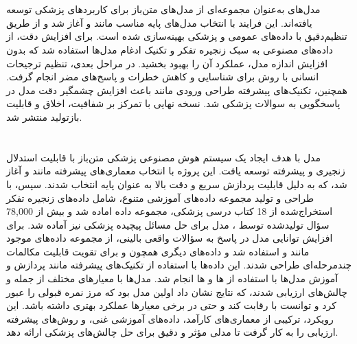 \documentclass[11pt, a4paper, oneside]{book}
\begin{document}
		\section{}
			مدل‌های  به‌عنوان مجموعه‌ای از مدل‌های متن‌باز برای کاربردهای پزشکی توسعه یافته‌اند. این فرایند با انتخاب مدل‌های پایه مناسب مانند  و  آغاز شد و از طریق تنظیم‌دقیق با داده‌های عمومی و پزشکی بهینه‌سازی شده است. برای افزایش دقت، از داده‌های مصنوعی به سبک زنجیره تفکر و تکنیک ادغام مدل‌ها استفاده شد که بدون افزایش اندازه مدل، عملکرد آن را بهبود بخشید. در مراحل بعدی، تنظیم ترجیحات انسانی با روش   برای شناسایی و کاهش خطرات و پاسخ‌های مضر انجام گرفت. همچنین، تکنیک‌های پیشرفته طراحی ورودی مانند  باعث افزایش چشمگیر دقت مدل در پاسخگویی به سوالات پزشکی شد. نسخه نهایی  با تمرکز بر شفافیت، اخلاق و قابلیت بازتولید منتشر شد. \cite{gururajan_aloe_2024}
			
		
		\section{}
			مدل  با هدف ایجاد یک سیستم هوش مصنوعی پزشکی متن‌باز با قابلیت استدلال زنجیری و پیشرفته توسعه یافت. این پروژه با انتخاب معماری‌های پیشرفته مانند  و  آغاز شد، که به دلیل قابلیت پردازش سریع و دقت بالا به عنوان پایه انتخاب شدند. سپس، با طراحی و تولید مجموعه داده‌های آموزشی متنوع، شامل داده‌های زنجیره‌ تفکر استخراج‌شده از 18 کتاب درسی پزشکی، مجموعه داده  اماده شد و بیش از 78,000 سؤال تولیدشده توسط ، مدل برای حل مسائل پیچیده پزشکی نیز آماده شد. برای افزایش توانایی مدل در پاسخ به سؤالات واقعی بالینی، از مجموعه داده‌های موجود مانند  و  استفاده شد و داده‌های دیگری همچون  و  برای تقویت قابلیت مکالمات چندمرحله‌ای طراحی شدند. این داده‌ها با استفاده از تکنیک‌های پیشرفته مانند  پردازش و آموزش مدل‌ها با استفاده از ها و ها انجام شد. مدل‌ها با معیارهای مختلف از جمله  و چالش‌های  ارزیابی شدند، که نتایج نشان داد  اولین مدل  بود که مرز نمره قبولی  را عبور کرد و  توانست با  رقابت کند و حتی در برخی معیارها عملکرد بهتری داشته باشد. این رویکرد، ترکیبی از معماری‌های کارآمد، داده‌های آموزشی غنی، و روش‌های پیشرفته ارزیابی را به کار گرفت تا مدلی مؤثر و دقیق برای حل چالش‌های پزشکی ارائه دهد. \cite{kim_small_2024}
		
\end{document}

